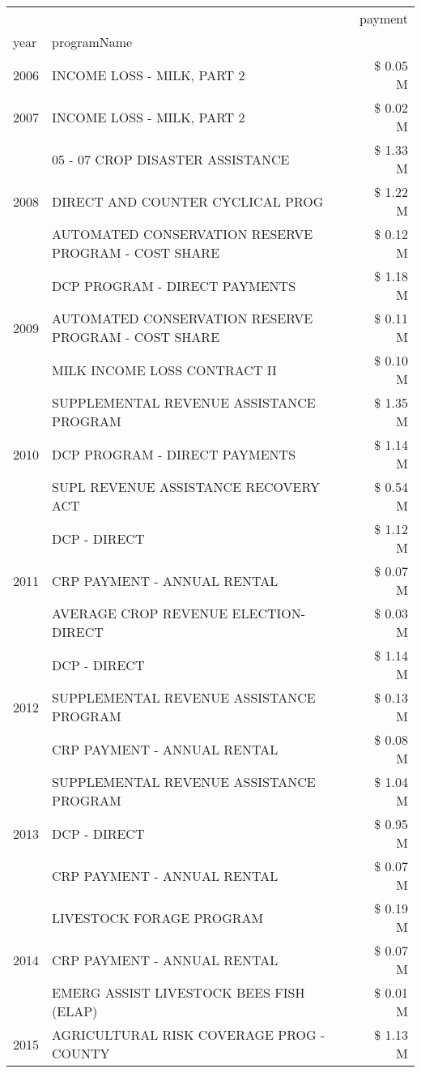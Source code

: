 \begin{tabular}{llr}
\toprule
 &  & payment \\
year & programName &  \\
\midrule
2006 & INCOME LOSS - MILK, PART 2 & \$ 0.05 M \\
\cline{1-3}
2007 & INCOME LOSS - MILK, PART 2 & \$ 0.02 M \\
\cline{1-3}
\multirow[t]{3}{*}{2008} & 05 - 07 CROP DISASTER ASSISTANCE & \$ 1.33 M \\
 & DIRECT AND COUNTER CYCLICAL PROG & \$ 1.22 M \\
 & AUTOMATED CONSERVATION RESERVE PROGRAM - COST SHARE & \$ 0.12 M \\
\cline{1-3}
\multirow[t]{3}{*}{2009} & DCP PROGRAM - DIRECT PAYMENTS & \$ 1.18 M \\
 & AUTOMATED CONSERVATION RESERVE PROGRAM - COST SHARE & \$ 0.11 M \\
 & MILK INCOME LOSS CONTRACT II & \$ 0.10 M \\
\cline{1-3}
\multirow[t]{3}{*}{2010} & SUPPLEMENTAL REVENUE ASSISTANCE PROGRAM & \$ 1.35 M \\
 & DCP PROGRAM - DIRECT PAYMENTS & \$ 1.14 M \\
 & SUPL REVENUE ASSISTANCE RECOVERY ACT & \$ 0.54 M \\
\cline{1-3}
\multirow[t]{3}{*}{2011} & DCP - DIRECT & \$ 1.12 M \\
 & CRP PAYMENT - ANNUAL RENTAL & \$ 0.07 M \\
 & AVERAGE CROP REVENUE ELECTION-DIRECT & \$ 0.03 M \\
\cline{1-3}
\multirow[t]{3}{*}{2012} & DCP - DIRECT & \$ 1.14 M \\
 & SUPPLEMENTAL REVENUE ASSISTANCE PROGRAM & \$ 0.13 M \\
 & CRP PAYMENT - ANNUAL RENTAL & \$ 0.08 M \\
\cline{1-3}
\multirow[t]{3}{*}{2013} & SUPPLEMENTAL REVENUE ASSISTANCE PROGRAM & \$ 1.04 M \\
 & DCP - DIRECT & \$ 0.95 M \\
 & CRP PAYMENT - ANNUAL RENTAL & \$ 0.07 M \\
\cline{1-3}
\multirow[t]{3}{*}{2014} & LIVESTOCK FORAGE PROGRAM & \$ 0.19 M \\
 & CRP PAYMENT - ANNUAL RENTAL & \$ 0.07 M \\
 & EMERG ASSIST LIVESTOCK BEES FISH (ELAP) & \$ 0.01 M \\
\cline{1-3}
\multirow[t]{3}{*}{2015} & AGRICULTURAL RISK COVERAGE PROG - COUNTY & \$ 1.13 M \\

\end{tabular}
